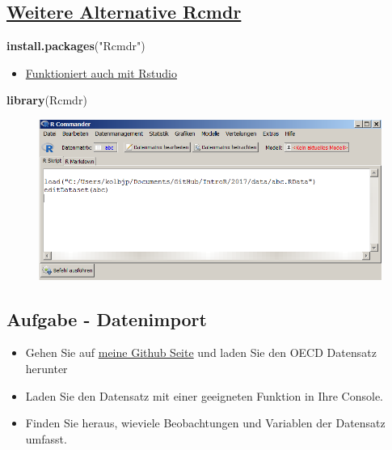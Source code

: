 \documentclass[]{article}
\newenvironment{Shaded}{\begin{snugshade}}{\end{snugshade}}
\newcommand{\KeywordTok}[1]{\textcolor[rgb]{0.13,0.29,0.53}{\textbf{{#1}}}}
\newcommand{\StringTok}[1]{\textcolor[rgb]{0.31,0.60,0.02}{{#1}}}
\newcommand{\NormalTok}[1]{{#1}}
\providecommand{\tightlist}{%
  \setlength{\itemsep}{0pt}\setlength{\parskip}{0pt}}
\begin{document}
\subsection{\texorpdfstring{\href{https://cran.r-project.org/web/packages/Rcmdr/index.html}{Weitere
Alternative
Rcmdr}}{Weitere Alternative Rcmdr}}\label{weitere-alternative-rcmdr}

\begin{Shaded}
\begin{Highlighting}[]
\KeywordTok{install.packages}\NormalTok{(}\StringTok{"Rcmdr"}\NormalTok{)}
\end{Highlighting}
\end{Shaded}

\begin{itemize}
\tightlist
\item
  \href{http://www.rcommander.com/}{Funktioniert auch mit Rstudio}
\end{itemize}

\begin{Shaded}
\begin{Highlighting}[]
\KeywordTok{library}\NormalTok{(Rcmdr)}
\end{Highlighting}
\end{Shaded}

\begin{figure}[htbp]
\centering
\includegraphics{figure/Rcommander.PNG}
\caption{}
\end{figure}

\subsection{Aufgabe - Datenimport}\label{aufgabe---datenimport}

\begin{itemize}
\item
  Gehen Sie auf
  \href{https://github.com/Japhilko/IntroR/blob/master/2017/data/oecd.dta?raw=true}{meine
  Github Seite} und laden Sie den OECD Datensatz herunter
\item
  Laden Sie den Datensatz mit einer geeigneten Funktion in Ihre Console.
\item
  Finden Sie heraus, wieviele Beobachtungen und Variablen der Datensatz
  umfasst.
\end{itemize}
\end{document}
